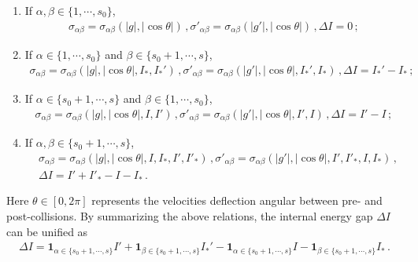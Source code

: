 \documentclass[reqno,11pt]{amsart}
\numberwithin{equation}{section}
\begin{document}
\begin{enumerate}
	\item If $\alpha, \beta \in \{ 1, \cdots, s_0 \}$, 
	\begin{equation*}
		\begin{aligned}
			\sigma_{\alpha \beta } = \sigma_{\alpha \beta } ( |g|, | \cos \theta | ) \,, \sigma'_{\alpha \beta } = \sigma_{\alpha \beta } ( |g'|, | \cos \theta | ) \,, \Delta I = 0 \,;
		\end{aligned}
	\end{equation*}
    \item If $\alpha \in \{ 1, \cdots, s_0 \}$ and $ \beta \in \{ s_0 + 1, \cdots, s \} $,
    \begin{equation*}
    	\begin{aligned}
    		\sigma_{\alpha \beta } = \sigma_{\alpha \beta } ( |g|, | \cos \theta |, I_*, I_*' ) \,, \sigma'_{\alpha \beta } = \sigma_{\alpha \beta } ( |g'|, | \cos \theta |, I_*', I_* ) \,, \Delta I = I_*' - I_* \,;
    	\end{aligned}
    \end{equation*}
    \item If $\alpha \in \{ s_0 + 1, \cdots, s \}$ and $ \beta \in \{ 1, \cdots, s_0 \} $,
    \begin{equation*}
    	\begin{aligned}
    		\sigma_{\alpha \beta } = \sigma_{\alpha \beta } ( |g|, | \cos \theta |, I, I' ) \,, \sigma'_{\alpha \beta } = \sigma_{\alpha \beta } ( |g'|, | \cos \theta |, I', I ) \,, \Delta I = I' - I \,;
    	\end{aligned}
    \end{equation*}
    \item If $\alpha, \beta \in \{ s_0 + 1, \cdots, s \}$, 
    \begin{equation*}
    	\begin{aligned}
    		& \sigma_{ \alpha \beta } = \sigma_{\alpha \beta } ( |g|, | \cos \theta |, I , I_* , I' ,I'_*) \,, \sigma'_{ \alpha \beta } = \sigma_{ \alpha \beta } ( |g'|, | \cos \theta |, I' , I'_*, I , I_* ) \,, \\
    		& \Delta I = I'+ I'_* - I - I_* \,.
    	\end{aligned}
    \end{equation*}
\end{enumerate}
Here $\theta \in [0, 2 \pi]$ represents the velocities deflection angular between pre- and post-collisions. By summarizing the above relations, the internal energy gap $\Delta I$ can be unified as
\begin{equation*}
    \begin{aligned}
        \Delta I = \mathbf{1}_{ \alpha \in \{ s_0 + 1, \cdots, s \} } I' + \mathbf{1}_{ \beta \in \{ s_0 + 1, \cdots, s \} }  I_*' - \mathbf{1}_{ \alpha \in \{ s_0 + 1, \cdots, s \} } I - \mathbf{1}_{ \beta \in \{ s_0 + 1, \cdots, s \} }  I_* \,.
    \end{aligned}
\end{equation*}
\end{document}
